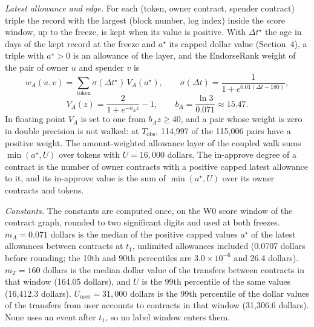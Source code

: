 \documentclass[10pt,letterpaper]{article}
\begin{document}
\textit{Latest allowance and edge.} For each (token, owner contract, spender contract) triple the record with the largest (block number, log index) inside the score window, up to the freeze, is kept when its value is positive. With $\Delta t^{\star}$ the age in days of the kept record at the freeze and $a^{\star}$ its capped dollar value (Section~4), a triple with $a^{\star}>0$ is an allowance of the layer, and the EndorseRank weight of the pair of owner $u$ and spender $v$ is
\[
w_A(u,v)=\sum_{\text{token}}\sigma(\Delta t^{\star})\,V_A(a^{\star}),\qquad
\sigma(\Delta t)=\frac{1}{1+e^{0.01(\Delta t-180)}},
\]
\[
V_A(z)=\frac{2}{1+e^{-b_A z}}-1,\qquad b_A=\frac{\ln 3}{0.071}\approx 15.47 .
\]
In floating point $V_A$ is set to one from $b_A z\ge 40$, and a pair whose weight is zero in double precision is not walked: at $T_{\mathrm{obs}}$, 114,997 of the 115,006 pairs have a positive weight. The amount-weighted allowance layer of the coupled walk sums $\min(a^{\star},U)$ over tokens with $U=16{,}000$ dollars. The in-approve degree of a contract is the number of owner contracts with a positive capped latest allowance to it, and its in-approve value is the sum of $\min(a^{\star},U)$ over its owner contracts and tokens.

\textit{Constants.} The constants are computed once, on the W0 score window of the contract graph, rounded to two significant digits and used at both freezes. $m_A=0.071$ dollars is the median of the positive capped values $a^{\star}$ of the latest allowances between contracts at $t_1$, unlimited allowances included (0.0707 dollars before rounding; the 10th and 90th percentiles are $3.0\times10^{-6}$ and 26.4 dollars). $m_T=160$ dollars is the median dollar value of the transfers between contracts in that window (164.05 dollars), and $U$ is the 99th percentile of the same values (16,412.3 dollars). $U_{\mathrm{user}}=31{,}000$ dollars is the 99th percentile of the dollar values of the transfers from user accounts to contracts in that window (31,306.6 dollars). None uses an event after $t_1$, so no label window enters them.
\end{document}
